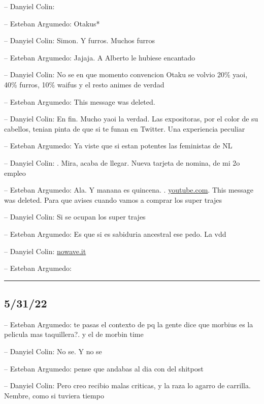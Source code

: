 -- Danyiel Colin:

-- Esteban Argumedo: Otakus*

-- Danyiel Colin: Simon. Y furros. Muchos furros

-- Esteban Argumedo: Jajaja. A Alberto le hubiese encantado

-- Danyiel Colin: No se en que momento convencion Otaku se volvio 20\%
yaoi, 40\% furros, 10\% waifus y el resto animes de verdad

-- Esteban Argumedo: This message was deleted.

-- Danyiel Colin: En fin. Mucho yaoi la verdad. Las expositoras, por el
color de su cabellos, tenian pinta de que si te funan en Twitter. Una
experiencia peculiar

-- Esteban Argumedo: Ya viste que si estan potentes las feministas de NL

-- Danyiel Colin: . Mira, acaba de llegar. Nueva tarjeta de nomina, de
mi 2o empleo

-- Esteban Argumedo: Ala. Y manana es quincena. .
\href{https://youtube.com/shorts/GKf3avS2QMg?feature=share}{youtube.com}.
This message was deleted. Para que avises cuando vamos a comprar los
super trajes

-- Danyiel Colin: Si se ocupan los super trajes

-- Esteban Argumedo: Es que si es sabiduria ancestral ese pedo. La vdd

-- Danyiel Colin:
\href{https://nowave.it/python-bytecode-analysis-1.html}{nowave.it}

-- Esteban Argumedo:

\begin{center}\rule{0.5\linewidth}{0.5pt}\end{center}

\hypertarget{section-90}{%
\subsection{5/31/22}\label{section-90}}

-- Esteban Argumedo: te pasas el contexto de pq la gente dice que
morbius es la pelicula mas taquillera?. y el de morbin time

-- Danyiel Colin: No se. Y no se

-- Esteban Argumedo: pense que andabas al dia con del shitpost

-- Danyiel Colin: Pero creo recibio malas criticas, y la raza lo agarro
de carrilla. Nembre, como si tuviera tiempo

